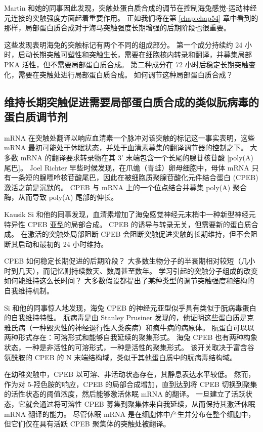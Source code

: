 Martin 和她的同事因此发现，突触处蛋白质合成的调节在控制海兔感觉-运动神经元连接的突触强度方面起着重要作用。 正如我们将在第 \ref{chap:chap54} 章中看到的那样，局部蛋白质合成对于海马突触强度长期增强的后期阶段也很重要。

这些发现表明海兔的突触标记有两个不同的组成部分。 第一个成分持续约 24 小时，启动长期突触可塑性和突触生长，需要在细胞核内转录和翻译，并募集局部 PKA 活性，但不需要局部蛋白质合成。 第二种成分在 72 小时后稳定长期突触变化，需要在突触处进行局部蛋白质合成。 如何调节这种局部蛋白质合成？

\subsection{维持长期突触促进需要局部蛋白质合成的类似朊病毒的蛋白质调节剂}
mRNA 在突触处翻译以响应血清素一个脉冲对该突触的标记这一事实表明，这些 mRNA 最初可能处于休眠状态，并处于血清素募集的翻译调节器的控制之下。 大多数 mRNA 的翻译要求转录物在其 3' 末端包含一个长尾的腺苷核苷酸 [poly(A) 尾巴]。 Joel Richter 早些时候发现，在爪蟾（青蛙）卵母细胞中，母体 mRNA 只有一条短的腺嘌呤核苷酸尾巴，因此在被细胞质聚腺苷酸化元件结合蛋白 (CPEB) 激活之前是沉默的。 CPEB 与 mRNA 上的一个位点结合并募集 poly(A) 聚合酶，从而导致 poly(A) 尾部的伸长。

Kausik Si 和他的同事发现，血清素增加了海兔感觉神经元末梢中一种新型神经元特异性 CPEB 亚型的局部合成。 CPEB 的诱导与转录无关，但需要新的蛋白质合成。 在激活的突触处局部阻断 CPEB 会阻断突触促进突触的长期维持，但不会阻断其启动和最初的 24 小时维持。

CPEB 如何稳定长期促进的后期阶段？ 大多数生物分子的半衰期相对较短（几小时到几天），而记忆则持续数天、数周甚至数年。 学习引起的突触分子组成的改变如何能维持这么长时间？ 大多数假设都提出了某种类型的调节突触强度和结构的自我维持机制。

Si 和他的同事惊人地发现，海兔 CPEB 的神经元亚型似乎具有类似于朊病毒蛋白的自我维持特性。 朊病毒是由 Stanley Prusiner 发现的，他证明这些蛋白质是克雅氏病（一种毁灭性的神经退行性人类疾病）和疯牛病的病原体。 朊蛋白可以以两种形式存在：可溶形式和能够自我延续的聚集形式。 海兔 CPEB 也有两种构象状态，一种是非活性的可溶形式，一种是活性的聚集形式。 该开关取决于富含谷氨酰胺的 CPEB 的 N 末端结构域，类似于其他蛋白质中的朊病毒结构域。

在幼稚突触中，CPEB 以可溶、非活动状态存在，其静息表达水平较低。 然而，作为对 5-羟色胺的响应，CPEB 的局部合成增加，直到达到将 CPEB 切换到聚集的活性状态的阈值浓度，然后能够激活休眠 mRNA 的翻译。 一旦建立了活跃状态，它就会通过将可溶性 CPEB 募集到聚集体来自我延续，从而保持其激活休眠 mRNA 翻译的能力。 尽管休眠 mRNA 是在细胞体中产生并分布在整个细胞中，但它们仅在具有活跃 CPEB 聚集体的突触处被翻译。

